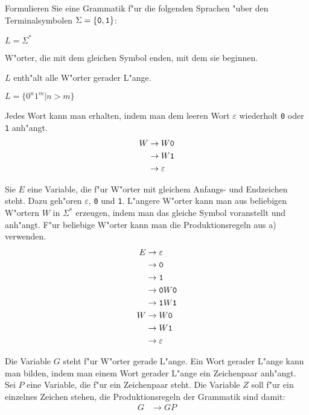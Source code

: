 Formulieren Sie eine Grammatik f"ur die folgenden Sprachen "uber
den Terminalsymbolen $\Sigma=\{{\tt 0},{\tt 1}\}$:
\begin{teilaufgaben}
\item $L=\Sigma^*$
\item W"orter, die mit dem gleichen Symbol enden, mit dem sie beginnen.
\item $L$ enth"alt alle W"orter gerader L"ange.
\item $L=\{0^n1^m|n>m\}$
\end{teilaufgaben}

\begin{loesung}
\begin{teilaufgaben}
\item
Jedes Wort kann man erhalten, indem man dem leeren Wort $\varepsilon$
wiederholt {\tt 0} oder {\tt 1} anh"angt.
\begin{align*}
W&\rightarrow W{\tt 0}\\
 &\rightarrow W{\tt 1}\\
 &\rightarrow\varepsilon
\end{align*}
\item Sie $E$ eine Variable, die f"ur W"orter mit gleichem Anfangs-
und Endzeichen steht. Dazu geh"oren $\varepsilon$, {\tt 0} und {\tt 1}.
L"angere
W"orter kann man aus beliebigen W"ortern $W$ in $\Sigma^*$ erzeugen,
indem man das gleiche Symbol voranstellt und anh"angt. F"ur beliebige
W"orter kann
man die Produktionsregeln aus a) verwenden.
\begin{align*}
E&\rightarrow \varepsilon\\
 &\rightarrow {\tt 0}\\
 &\rightarrow {\tt 1}\\
 &\rightarrow {\tt 0}W{\tt 0}\\
 &\rightarrow {\tt 1}W{\tt 1}\\
W&\rightarrow W{\tt 0}\\
 &\rightarrow W{\tt 1}\\
 &\rightarrow\varepsilon
\end{align*}
\item Die Variable $G$ steht f"ur W"orter gerade L"ange. Ein Wort
gerader L"ange kann man bilden, indem man einem Wort gerader L"ange
ein Zeichenpaar anh"angt. Sei $P$ eine Variable, die f"ur ein Zeichenpaar
steht. Die Variable $Z$ soll f"ur ein einzelnes Zeichen stehen, die
Produktionsregeln der Grammatik sind damit:
\begin{align*}
G&\rightarrow GP\\

\end{align*}
\end{teilaufgaben}
\end{loesung}
